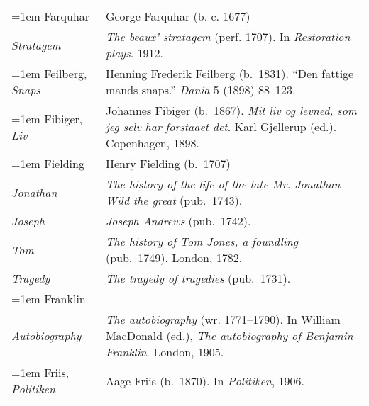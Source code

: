 \begin{xltabular}{\textwidth}{ lQ }
\hangindent=1em  Farquhar & George Farquhar (b. c. 1677)\\
\hspace{1em}\textit{Stratagem} & \textit{The beaux' stratagem} (perf. 1707). In \textit{Restoration plays}. 1912.  \\

\hangindent=1em  Feilberg, \textit{Snaps} & Henning Frederik Feilberg (b.~1831). ``Den fattige mands snaps.'' \textit{Dania} 5 (1898) 88--123. \\ %

\hangindent=1em  Fibiger, \textit{Liv} & Johannes Fibiger (b.~1867). \textit{Mit liv og levned, som jeg selv har forstaaet det}. Karl Gjellerup (ed.). Copenhagen, 1898. \\

\hangindent=1em  Fielding & Henry Fielding (b.~1707)\\
\hspace{1em}\textit{Jonathan} & \textit{The history of the life of the late Mr. Jonathan Wild the great} (pub.~1743). \\ %
\hspace{1em}\textit{Joseph} & \textit{Joseph Andrews} (pub.~1742). \\
\hspace{1em}\textit{Tom} & \textit{The history of Tom Jones, a foundling} (pub.~1749). London, 1782. \\
\hspace{1em}\textit{Tragedy} & \textit{The tragedy of tragedies} (pub.~1731). \\

\hangindent=1em  Franklin & \\
\hspace{1em} \textit{Autobiography} & \textit{The autobiography} (wr. 1771–1790). In William MacDonald (ed.), \textit{The autobiography of Benjamin Franklin}. London, 1905. \\

\hangindent=1em  Friis, \textit{Politiken} & Aage Friis (b.~1870). In \textit{Politiken}, 1906. \\ %


\end{xltabular}
